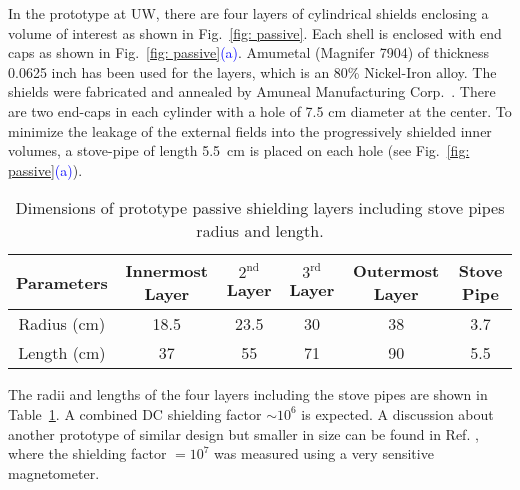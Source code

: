 


In the prototype at UW, there are four layers of cylindrical shields enclosing a volume of interest as shown in Fig.~\ref{fig: passive}. Each shell is enclosed  with end caps as shown in Fig.~\ref{fig: passive}\textcolor{blue}{(a)}. Amumetal (Magnifer 7904) of thickness 0.0625 inch has been used for the layers,  which is an 80\% Nickel-Iron alloy. The shields were fabricated and annealed by Amuneal Manufacturing Corp.~\cite{mu-metal}.  There are two end-caps in each cylinder with a hole of 7.5 cm diameter at the center. To minimize the leakage of the external fields into the progressively shielded inner volumes, a stove-pipe of length 5.5~cm is placed on each hole (see Fig.~\ref{fig: passive}\textcolor{blue}{(a)}).

\begin{table} [!htb]
    \centering
    \begin{tabular} { |c|c|c|c|c|c|} 
        \hline
        Parameters & Innermost Layer & $\mathrm{2^{nd}}$ Layer & $\mathrm{3^{rd}}$ Layer & Outermost Layer & Stove Pipe\\
        \hline\hline
        Radius (cm) & 18.5 & 23.5 & 30 & 38 & 3.7 \\ 
        \hline
        Length (cm) & 37 & 55 & 71 & 90 & 5.5 \\ 
         \hline
    \end{tabular}
    \caption[Dimensions of prototype passive shielding layers]{Dimensions of prototype passive shielding layers including stove pipes radius and length.}\label{table:mu-metal}
\end{table}

The radii and lengths of the four layers including the stove pipes are shown in Table~\ref{table:mu-metal}. A combined DC shielding factor $\sim\mathrm{10^6}$ is expected. A discussion about another prototype of similar design but smaller in size can be found in Ref. \cite{baby_shield}, where the shielding factor $=\mathrm{10^7}$ was measured using a very sensitive magnetometer.



